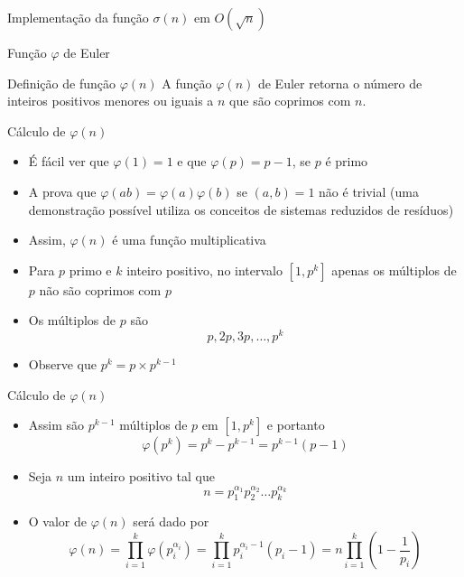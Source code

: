 \begin{frame}[fragile]{Implementação da função $\sigma(n)$ em $O(\sqrt{n})$}
\end{frame}

\begin{frame}[fragile]{Função $\varphi$ de Euler}
    \begin{block}{Definição de função $\varphi(n)$}
        A função $\varphi(n)$ de Euler retorna o número de inteiros positivos menores ou iguais a $n$ que são coprimos com $n$.
    \end{block}
\end{frame}

\begin{frame}[fragile]{Cálculo de $\varphi(n)$}

    \begin{itemize}
        \item É fácil ver que $\varphi(1) = 1$ e que $\varphi(p) = p - 1$, se $p$ é primo

        \item A prova que $\varphi(ab) = \varphi(a)\varphi(b)$ se $(a, b) = 1$ não é trivial (uma demonstração possível utiliza os conceitos de sistemas reduzidos de resíduos)

        \item Assim, $\varphi(n)$ é uma função multiplicativa

        \item Para $p$ primo e $k$ inteiro positivo, no intervalo $[1, p^k]$ apenas os múltiplos de $p$ não são coprimos com $p$

        \item Os múltiplos de $p$ são
$$
    p, 2p, 3p, \ldots, p^k
$$

        \item Observe que $p^k = p\times p^{k - 1}$
    \end{itemize}

\end{frame}

\begin{frame}[fragile]{Cálculo de $\varphi(n)$}

    \begin{itemize}

        \item Assim são $p^{k - 1}$ múltiplos de $p$ em $[1, p^k]$ e portanto
$$
    \varphi(p^k) = p^k - p^{k - 1} = p^{k - 1}(p - 1)
$$

        \item Seja $n$ um inteiro positivo tal que
$$
    n = p_1^{\alpha_1}p_2^{\alpha_2}\ldots p_k^{\alpha_k}
$$


        \item O valor de $\varphi(n)$ será dado por
$$
    \varphi(n) = \prod_{i = 1}^k \varphi(p_i^{\alpha_i}) = \prod_{i = 1}^k p_i^{\alpha_i - 1}\left(p_i - 1\right) = n \prod_{i = 1}^k \left(1 - \frac{1}{p_i}\right)
$$

    \end{itemize}

\end{frame}

